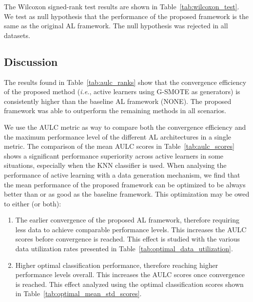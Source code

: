 \documentclass[preprint,12pt]{elsarticle}
\begin{document}
The Wilcoxon signed-rank test results are shown in
Table~\ref{tab:wilcoxon_test}. We test as null hypothesis that the performance
of the proposed framework is the same as the original AL framework. The null
hypothesis was rejected in all datasets.


\subsection{Discussion}

The results found in Table~\ref{tab:aulc_ranks} show that the convergence
efficiency of the proposed method (\textit{i.e.}, active learners using
G-SMOTE as generators) is consistently higher than the baseline AL framework
(NONE). The proposed framework was able to outperform the remaining methods in
all scenarios. 

We use the AULC metric as way to compare both the convergence efficiency and
the maximum performance level of the different AL architectures in a single
metric. The comparison of the mean AULC scores in Table~\ref{tab:aulc_scores}
shows a significant performance superiority across active learners in some
situations, especially when the KNN classifier is used. When analysing
the performance of active learning with a data generation mechanism,
we find that the mean performance of the proposed framework can be optimized
to be always better than or as good as the baseline framework. This optimization may
be owed to either (or both):

\begin{enumerate}
    \item The earlier convergence of the proposed AL framework, therefore
        requiring less data to achieve comparable performance levels. This
        increases the AULC scores before convergence is reached. This effect
        is studied with the various data utilization rates presented in
        Table~\ref{tab:optimal_data_utilization}.
    \item Higher optimal classification performance, therefore reaching higher
        performance levels overall. This increases the AULC scores once
        convergence is reached. This effect analyzed using the optimal
        classification scores shown in
        Table~\ref{tab:optimal_mean_std_scores}.
\end{enumerate} 
\end{document}
